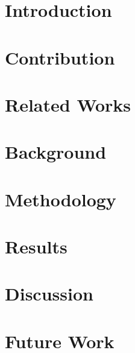 \documentclass[acmtog, screen, balance]{acmart}
\begin{document}
\maketitle


\section{Introduction} \label{introduction}


\section{Contribution}


\section{Related Works}


\section{Background}


\section{Methodology}


\section{Results}


\section{Discussion}


\section{Future Work}

\end{document}
